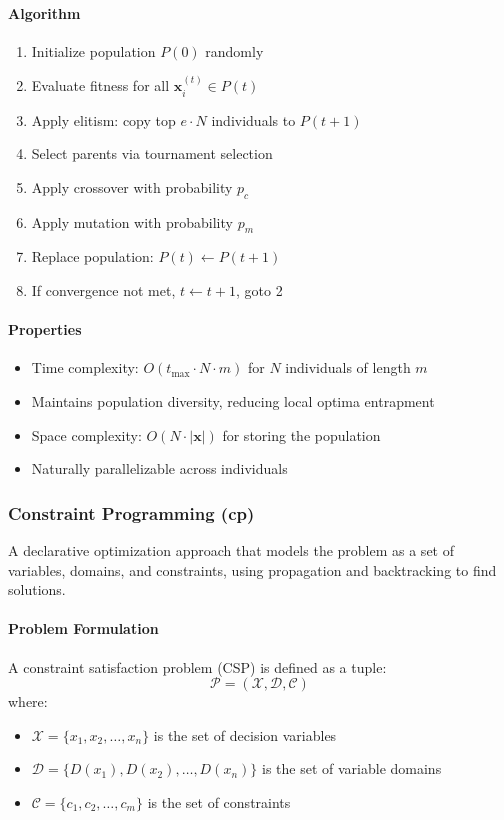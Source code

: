 \documentclass{report}
\begin{document}
\paragraph{Algorithm}
\begin{enumerate}
\item Initialize population $P(0)$ randomly
\item Evaluate fitness for all $\mathbf{x}_i^{(t)} \in P(t)$
\item Apply elitism: copy top $e \cdot N$ individuals to $P(t+1)$
\item Select parents via tournament selection
\item Apply crossover with probability $p_c$
\item Apply mutation with probability $p_m$
\item Replace population: $P(t) \leftarrow P(t+1)$
\item If convergence not met, $t \leftarrow t+1$, goto 2
\end{enumerate}

\paragraph{Properties}
\begin{itemize}
\item Time complexity: $O(t_{\max} \cdot N \cdot m)$ for $N$ individuals of length $m$
\item Maintains population diversity, reducing local optima entrapment
\item Space complexity: $O(N \cdot |\mathbf{x}|)$ for storing the population
\item Naturally parallelizable across individuals
\end{itemize}

\subsubsection{Constraint Programming (cp)}
A declarative optimization approach that models the problem as a set of variables, domains, and constraints, using propagation and backtracking to find solutions.

\paragraph{Problem Formulation}
A constraint satisfaction problem (CSP) is defined as a tuple:
\begin{equation}
\mathcal{P} = (\mathcal{X}, \mathcal{D}, \mathcal{C})
\end{equation}
where:
\begin{itemize}
\item $\mathcal{X} = \{x_1, x_2, \ldots, x_n\}$ is the set of decision variables
\item $\mathcal{D} = \{D(x_1), D(x_2), \ldots, D(x_n)\}$ is the set of variable domains
\item $\mathcal{C} = \{c_1, c_2, \ldots, c_m\}$ is the set of constraints
\end{itemize}
\end{document}
